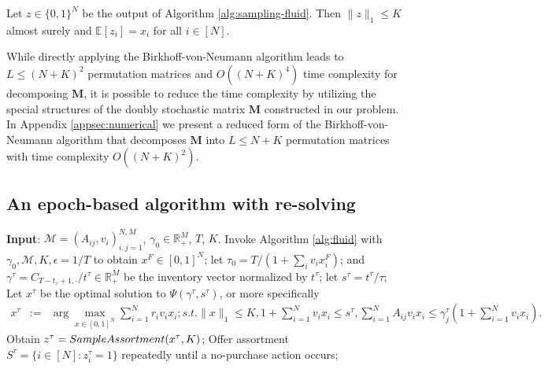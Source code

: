 \documentclass[opre]{informs3aa}
\newcommand{\mat}{\mathbf }
\begin{document}
\begin{proposition}
Let $z\in\{0,1\}^N$ be the output of Algorithm \ref{alg:sampling-fluid}. Then $\|z\|_1\leq K$ almost surely and $\mathbb E[z_i]=x_i$ for all $i\in[N]$.
\label{prop:sampling-fluid}
\end{proposition}

\begin{remark}
While directly applying the Birkhoff-von-Neumann algorithm leads to $L\leq (N+K)^2$ permutation matrices and $O((N+
K)^4)$ time complexity for decomposing
$\mat M$, it is possible to reduce the time complexity by utilizing the special structures of the doubly stochastic matrix $\mat M$ constructed in our problem.
In Appendix \ref{appsec:numerical} we present a reduced form of the Birkhoff-von-Neumann algorithm that decomposes $\mat M$ into $L\leq N+K$ permutation matrices
with time complexity $O((N+K)^2)$.
\end{remark}


\subsection{An epoch-based algorithm with re-solving}\label{subsec:epoch}

\begin{algorithm}[t]
\caption{An epoch-based algorithm with re-solving heuristic}
\label{alg:resolve}
\begin{algorithmic}[1]
\State \textbf{Input}: $\mathcal M=(A_{ij},v_i)_{i,j=1}^{N,M}$, $\gamma_0\in\mathbb R_+^M$, $T$, $K$.
\State Invoke Algorithm \ref{alg:fluid} with $\gamma_0,\mathcal M,K,\epsilon=1/T$ to obtain $x^F\in[0,1]^N$; let $\tau_0 = T/(1+\sum_iv_ix_i^F)$;
	 and $\gamma^\tau=C_{T-t_\tau+1,\cdot}/t^\tau\in\mathbb R_+^M$ be the inventory vector
	normalized by $t^\tau$; let $s^\tau=t^\tau/\tau$;
	\State Let $x^\tau$ be the optimal solution to $\Psi(\gamma^\tau,s^\tau)$, or more specifically
	\begin{eqnarray}
	x^{\tau} &:=& \arg\max_{x\in[0,1]^N} \sum_{i=1}^N r_iv_ix_i;s.t. \|x\|_1\leq K, 1+\sum_{i=1}^Nv_ix_i \leq s^\tau, \sum_{i=1}^N A_{ij}v_ix_i \leq \gamma^\tau_j\left(1+\sum_{i=1}^Nv_ix_i\right).\label{eq:fluid-resolve}
	\end{eqnarray}
	\State Obtain $z^\tau = \textsc{SampleAssortment}(x^\tau,K)$;
	\State Offer assortment $S^\tau=\{i\in[N]: z^\tau_i = 1\}$ repeatedly until a no-purchase action occurs;
\EndFor
\end{algorithmic}
\end{algorithm}
\end{document}
